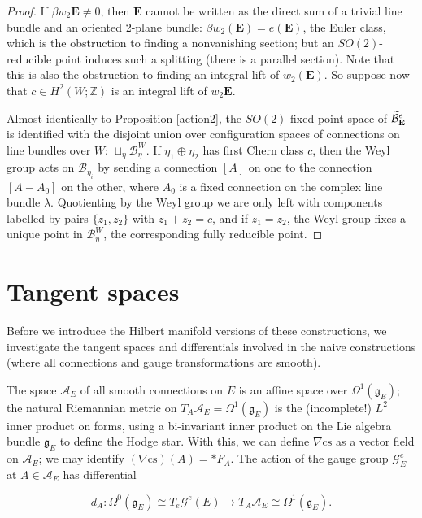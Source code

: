 \documentclass{memo-l}
\theoremstyle{definition}
\theoremstyle{remark}
\numberwithin{section}{chapter}
\numberwithin{equation}{chapter}
\begin{document}
\begin{proof}If $\beta w_2 \mathbf{E} \neq 0$, then $\mathbf{E}$ cannot be written as the direct sum of a trivial line bundle and an oriented 2-plane bundle: $\beta w_2(\mathbf{E}) = e(\mathbf{E})$, the Euler class, which is the obstruction to finding a nonvanishing section; but an $SO(2)$-reducible point induces such a splitting (there is a parallel section). Note that this is also the obstruction to finding an integral lift of $w_2(\mathbf{E})$. So suppose now that $c \in H^2(W;\mathbb Z)$ is an integral lift of $w_2 \mathbf{E}$.

Almost identically to Proposition \ref{action2}, the $SO(2)$-fixed point space of $\widetilde{\mathcal B}^{e}_{\bf E}$ is identified with the disjoint union over configuration spaces of connections on line bundles over $W$: $\sqcup_{\eta} \mathcal B^{W}_{\eta}$. If $\eta_1 \oplus \eta_2$ has first Chern class $c$, then the Weyl group acts on $\mathcal B_{\eta_i}$ by sending a connection $[A]$ on one to the connection $[A - A_0]$ on the other, where $A_0$ is a fixed connection on the complex line bundle $\lambda$. Quotienting by the Weyl group we are only left with components labelled by pairs $\{z_1, z_2\}$ with $z_1 + z_2 = c$, and if $z_1 = z_2$, the Weyl group fixes a unique point in $\mathcal B^W_\eta$, the corresponding fully reducible point.
\end{proof}

\section{Tangent spaces}\label{sec:config-tangent}
Before we introduce the Hilbert manifold versions of these constructions, we investigate the tangent spaces and differentials involved in the naive constructions (where all connections and gauge transformations are smooth). 

The space $\mathcal A_E$ of all smooth connections on $E$ is an affine space over $\Omega^1(\mathfrak g_E)$; the natural Riemannian metric on $T_A \mathcal A_E = \Omega^1(\mathfrak g_E)$ is the (incomplete!) $L^2$ inner product on forms, using a bi-invariant inner product on the Lie algebra bundle $\mathfrak g_E$ to define the Hodge star. With this, we can define $\nabla \text{cs}$ as a vector field on $\mathcal A_E$; we may identify $(\nabla \text{cs})(A) = *F_A$. The action of the gauge group $\mathcal G^e_E$ at $A \in \mathcal A_E$ has differential 

$$d_A: \Omega^0(\mathfrak g_E) \cong T_e \mathcal G^e(E) \to T_A \mathcal A_E \cong \Omega^1(\mathfrak g_E).$$
\end{document}
